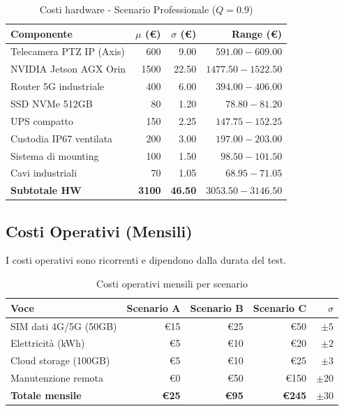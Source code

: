 \documentclass[a4paper,11pt]{article}
\begin{document}
\begin{table}[H]
    \centering
    \begin{tabular}{lrrr}
        \toprule
        \textbf{Componente} & \textbf{$\mu$ (€)} & \textbf{$\sigma$ (€)} & \textbf{Range (€)} \\
        \midrule
        Telecamera PTZ IP (Axis) & 600 & 9.00 & $591.00 - 609.00$ \\
        NVIDIA Jetson AGX Orin & 1500 & 22.50 & $1477.50 - 1522.50$ \\
        Router 5G industriale & 400 & 6.00 & $394.00 - 406.00$ \\
        SSD NVMe 512GB & 80 & 1.20 & $78.80 - 81.20$ \\
        UPS compatto & 150 & 2.25 & $147.75 - 152.25$ \\
        Custodia IP67 ventilata & 200 & 3.00 & $197.00 - 203.00$ \\
        Sistema di mounting & 100 & 1.50 & $98.50 - 101.50$ \\
        Cavi industriali & 70 & 1.05 & $68.95 - 71.05$ \\
        \midrule
        \textbf{Subtotale HW} & \textbf{3100} & \textbf{46.50} & $\mathbf{3053.50 - 3146.50}$ \\
        \bottomrule
    \end{tabular}
    \caption{Costi hardware - Scenario Professionale ($Q = 0.9$)}
\end{table}

\subsection{Costi Operativi (Mensili)}

I costi operativi sono ricorrenti e dipendono dalla durata del test.

\begin{table}[H]
    \centering
    \begin{tabular}{lrrrr}
        \toprule
        \textbf{Voce} & \textbf{Scenario A} & \textbf{Scenario B} & \textbf{Scenario C} & \textbf{$\sigma$} \\
        \midrule
        SIM dati 4G/5G (50GB) & €15 & €25 & €50 & $\pm 5$ \\
        Elettricità (kWh) & €5 & €10 & €20 & $\pm 2$ \\
        Cloud storage (100GB) & €5 & €10 & €25 & $\pm 3$ \\
        Manutenzione remota & €0 & €50 & €150 & $\pm 20$ \\
        \midrule
        \textbf{Totale mensile} & \textbf{€25} & \textbf{€95} & \textbf{€245} & $\pm 30$ \\
        \bottomrule
    \end{tabular}
    \caption{Costi operativi mensili per scenario}
\end{table}
\end{document}
